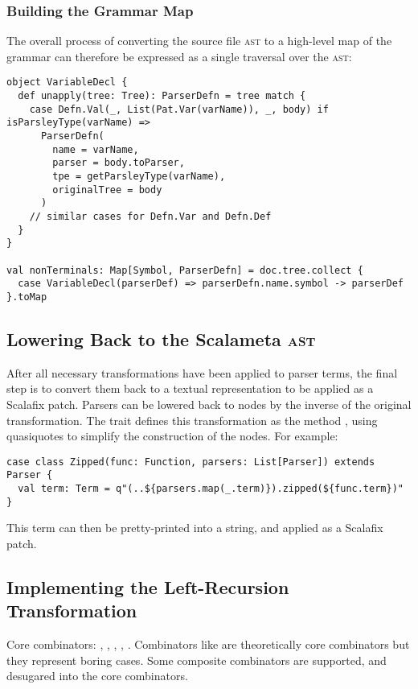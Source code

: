 \documentclass[../../main.tex]{subfiles}
\begin{document}
\subsubsection{Building the Grammar Map}
The overall process of converting the source file \textsc{ast} to a high-level map of the grammar can therefore be expressed as a single traversal over the \textsc{ast}:
\begin{verbatim}
object VariableDecl {
  def unapply(tree: Tree): ParserDefn = tree match {
    case Defn.Val(_, List(Pat.Var(varName)), _, body) if isParsleyType(varName) =>
      ParserDefn(
        name = varName,
        parser = body.toParser,
        tpe = getParsleyType(varName),
        originalTree = body
      )
    // similar cases for Defn.Var and Defn.Def
  }
}

val nonTerminals: Map[Symbol, ParserDefn] = doc.tree.collect {
  case VariableDecl(parserDef) => parserDefn.name.symbol -> parserDef
}.toMap
\end{verbatim}

\subsection{Lowering Back to the Scalameta \textsc{ast}}\label{sec:lowering-parsers}
After all necessary transformations have been applied to parser terms, the final step is to convert them back to a textual representation to be applied as a Scalafix patch.
Parsers can be lowered back to  nodes by the inverse of the original  transformation.
The  trait defines this transformation as the method , using quasiquotes to simplify the construction of the  nodes.
For example:
\begin{verbatim}
case class Zipped(func: Function, parsers: List[Parser]) extends Parser {
  val term: Term = q"(..${parsers.map(_.term)}).zipped(${func.term})"
}
\end{verbatim}
%
This term can then be pretty-printed into a string, and applied as a Scalafix patch.

\subsection{Implementing the Left-Recursion Transformation}

Core combinators: , , , , .
Combinators like  are theoretically core combinators but they represent boring cases.
Some composite combinators are supported, and desugared into the core combinators.
\end{document}
